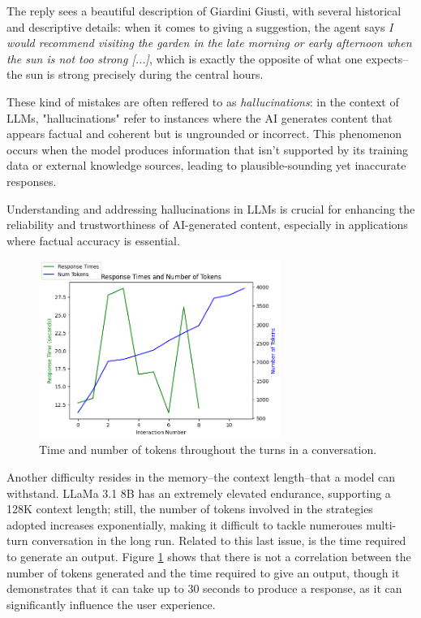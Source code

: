 The reply sees a beautiful description of Giardini Giusti, with several historical and descriptive details: when it comes to giving a suggestion, the agent says \textit{I would recommend visiting the garden in the late morning or early afternoon when the sun is not too strong [...]}, which is exactly the opposite of what one expects--the sun is strong precisely during the central hours.

These kind of mistakes are often reffered to as \textit{hallucinations}: in the context of LLMs, "hallucinations" refer to instances where the AI generates content that appears factual and coherent but is ungrounded or incorrect. This phenomenon occurs when the model produces information that isn't supported by its training data or external knowledge sources, leading to plausible-sounding yet inaccurate responses. \cite{hallucinations2023}

Understanding and addressing hallucinations in LLMs is crucial for enhancing the reliability and trustworthiness of AI-generated content, especially in applications where factual accuracy is essential.

\begin{figure}[htpb]
    \centering
    \includegraphics[width=0.7\textwidth]{images/resp-time-num-tokens.png}
    \caption{Time and number of tokens throughout the turns in a conversation.}
    \label{fig:time-tokens}
\end{figure}

Another difficulty resides in the memory--the context length--that a model can withstand. LLaMa 3.1 8B has an extremely elevated endurance, supporting a 128K context length; still, the number of tokens involved in the strategies adopted increases exponentially, making it difficult to tackle numeroues multi-turn conversation in the long run. Related to this last issue, is the time required to generate an output. Figure \ref{fig:time-tokens} shows that there is not a correlation between the number of tokens generated and the time required to give an output, though it demonstrates that it can take up to 30 seconds to produce a response, as it can significantly influence the user experience.

